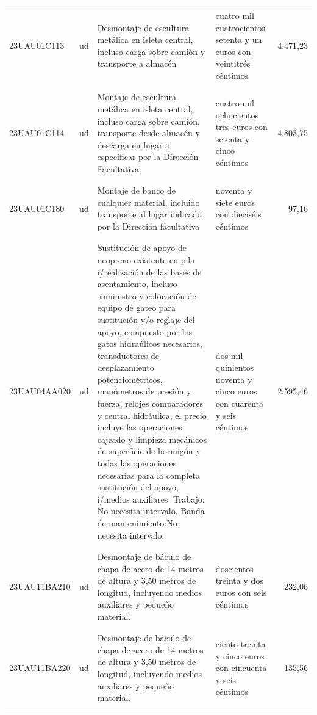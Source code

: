 \documentclass{book}%
\begin{document}
\begin{longtable}{|l|l|p{5cm}|p{3cm}|r|}
&&&&\\%
23UAU01C113&ud&Desmontaje de escultura metálica en isleta central, incluso carga sobre camión y transporte a almacén&cuatro mil cuatrocientos setenta y un euros con veintitrés céntimos&4.471,23\\%
&&&&\\%
&&&&\\%
23UAU01C114&ud&Montaje de escultura metálica en isleta central, incluso carga sobre camión, transporte desde almacén y descarga en lugar a especificar por la Dirección Facultativa.&cuatro mil ochocientos tres euros con setenta y cinco céntimos&4.803,75\\%
&&&&\\%
&&&&\\%
23UAU01C180&ud&Montaje de banco de cualquier material, incluido transporte al lugar indicado por la Dirección facultativa&noventa y siete euros con dieciséis céntimos&97,16\\%
&&&&\\%
&&&&\\%
23UAU04AA020&ud&Sustitución de apoyo de neopreno existente en pila i/realización de las bases de asentamiento, incluso suministro y colocación de equipo de gateo para sustitución y/o reglaje del apoyo, compuesto por los gatos hidraúlicos necesarios, transductores de desplazamiento potenciométricos, manómetros de presión y fuerza, relojes comparadores y central hidráulica, el precio incluye las operaciones cajeado y limpieza mecánicos de superficie de hormigón y todas las operaciones necesarias para la completa sustitución del apoyo, i/medios auxiliares. Trabajo: No necesita intervalo. Banda de mantenimiento:No necesita intervalo.&dos mil quinientos noventa y cinco euros con cuarenta y seis céntimos&2.595,46\\%
&&&&\\%
&&&&\\%
23UAU11BA210&ud&Desmontaje de báculo de chapa de acero de 14 metros de altura y 3,50 metros de longitud, incluyendo medios auxiliares y pequeño material.&doscientos treinta y dos euros con seis céntimos&232,06\\%
&&&&\\%
&&&&\\%
23UAU11BA220&ud&Desmontaje de báculo de chapa de acero de 14 metros de altura y 3,50 metros de longitud, incluyendo medios auxiliares y pequeño material.&ciento treinta y cinco euros con cincuenta y seis céntimos&135,56\\%
&&&&\\%

\end{longtable}
\end{document}
